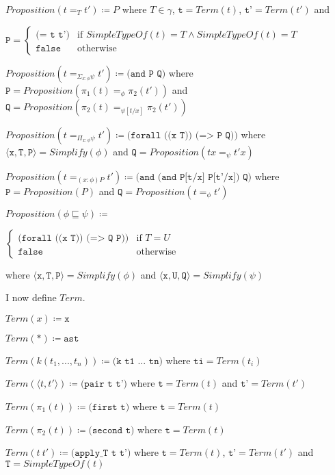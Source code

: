 \documentclass[12pt,a4paper,titlepage]{article}
\newcommand{\triple}[3]{\langle \texttt{#1} , \texttt{#2} , \texttt{#3} \rangle}
\begin{document}
    $Proposition(t =_T t') \coloneqq P$
    where $T \in \gamma$, $\texttt{t} = Term(t)$, $\texttt{t'} = Term(t')$ and

    $\texttt{P} = \begin{cases}
        \texttt{(= t t')} & \text{if } SimpleTypeOf(t)=T \land SimpleTypeOf(t)=T\\
        \texttt{false} & \text{otherwise}
    \end{cases}$

    $Proposition(t =_{\Sigma_{x: \phi} \psi} t') \coloneqq
    \texttt{(and P Q)}$ where
    $\texttt{P} = Proposition(\pi_1 (t) =_\phi \pi_2 (t'))$ and
    $\texttt{Q} = Proposition(\pi_2 (t) =_{\psi[t/x]} \pi_2 (t'))$

    $Proposition(t =_{\Pi_{x: \phi} \psi} t') \coloneqq
    \texttt{(forall ((x T)) (=> P Q))}$
    where $\triple{x}{T}{P} = Simplify(\phi)$ and $\texttt{Q} = Proposition(tx =_\psi t'x)$

    $Proposition(t =_{(x: \phi)P} t') \coloneqq
    \texttt{(and (and P[t/x] P[t'/x]) Q)}$
    where $\texttt{P} = Proposition(P)$ and
    $\texttt{Q} = Proposition(t =_\phi t')$

    $Proposition(\phi \sqsubseteq \psi) \coloneqq$

    $\begin{cases}
        \texttt{(forall ((x T)) (=> Q P))} & \text{if } T=U\\
        \texttt{false} & \text{otherwise}
    \end{cases}$

    where $\triple{x}{T}{P} = Simplify(\phi)$ and $\triple{x}{U}{Q} = Simplify(\psi)$

    I now define $Term$.

    $Term(x) \coloneqq \texttt{x}$

    $Term(\ast) \coloneqq \texttt{ast}$

    $Term(k(t_1, ..., t_n)) \coloneqq \texttt{(k t1 ... tn)}$ where $\texttt{ti} = Term(t_i)$

    $Term(\langle t, t' \rangle) \coloneqq \texttt{(pair t t')}$
    where $\texttt{t} = Term(t)$ and $\texttt{t'} = Term(t')$

    $Term(\pi_1 (t)) \coloneqq \texttt{(first t)}$ where $\texttt{t} = Term(t)$

    $Term(\pi_2 (t)) \coloneqq \texttt{(second t)}$ where $\texttt{t} = Term(t)$

    $Term(t\ t') \coloneqq \texttt{(apply\_T t t')}$
    where $\texttt{t} = Term(t)$, $\texttt{t'} = Term(t')$ and $\texttt{T} = SimpleTypeOf(t)$
\end{document}

